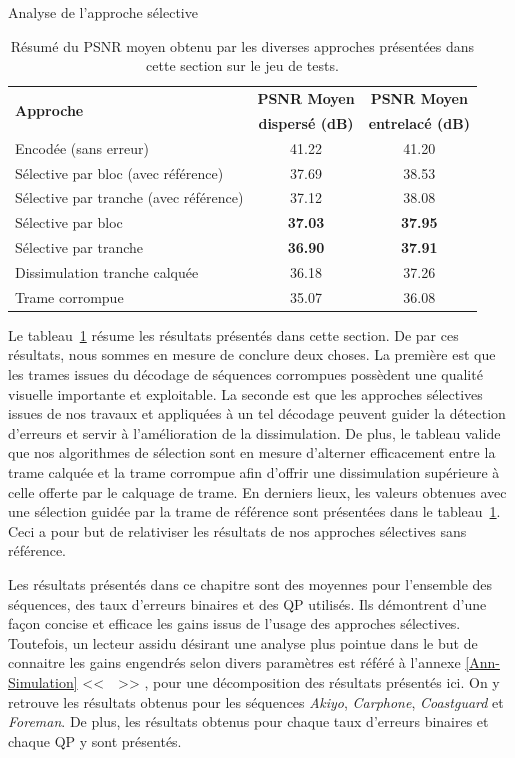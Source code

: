 \begin{section}{Analyse de l'approche sélective}
\begin{table}
\caption[Résumé du PSNR moyen obtenu par les diverses approches
présentées]{Résumé du PSNR moyen obtenu par les diverses approches présentées dans cette section sur le jeu de tests.}
\label{tab-ResumeSelectif}
\small
\centering
\begin{tabular}{| l | c | c |}
 \hline
 \multirow{2}{*}{\textbf{Approche}} & \textbf{PSNR Moyen}& \textbf{PSNR
 Moyen}\\ &\textbf{dispersé (dB)}&\textbf{entrelacé (dB)}\\
 \hline
 Encodée (sans erreur) & 41.22 & 41.20\\
  \hline
 Sélective par bloc (avec référence) & 37.69 & 38.53\\
  \hline
 Sélective par tranche (avec référence) & 37.12 & 38.08\\
  \hline
 Sélective par bloc & \textbf{37.03} & \textbf{37.95}\\
  \hline
 Sélective par tranche & \textbf{36.90} & \textbf{37.91}\\
  \hline
 Dissimulation tranche calquée & 36.18 & 37.26\\
  \hline
 Trame corrompue & 35.07 & 36.08\\
 \hline   
\end{tabular}
\end{table}

Le tableau~\ref{tab-ResumeSelectif} résume les résultats présentés dans cette
section. De par ces résultats, nous sommes en mesure de conclure deux choses. La
première est que les trames issues du décodage de séquences corrompues possèdent
une qualité visuelle importante et exploitable. La seconde est que les approches
sélectives issues de nos travaux et appliquées à un tel décodage peuvent guider
la détection d'erreurs et servir à l'amélioration de la dissimulation. De plus,
le tableau valide que nos algorithmes de sélection sont en mesure d’alterner
efficacement entre la trame calquée et la trame corrompue afin d’offrir une
dissimulation supérieure à celle offerte par le calquage de trame. En derniers
lieux, les valeurs obtenues avec une sélection guidée par la trame de référence
sont présentées dans le tableau~\ref{tab-ResumeSelectif}. Ceci a pour but
de relativiser les résultats de nos approches sélectives sans référence.

Les résultats présentés dans ce chapitre sont des moyennes pour l'ensemble des
séquences, des taux d'erreurs binaires et des QP utilisés. Ils démontrent d'une
façon concise et efficace les gains issus de l'usage des approches sélectives.
Toutefois, un lecteur assidu désirant une analyse plus pointue dans le but de
connaitre les gains engendrés selon divers paramètres est référé à l'annexe
\ref{Ann-Simulation} <<~~>> , pour
une décomposition des résultats présentés ici. On y retrouve les résultats
obtenus pour les séquences \textit{Akiyo}, \textit{Carphone},
\textit{Coastguard} et \textit{Foreman}. De plus, les résultats obtenus pour
chaque taux d'erreurs binaires et chaque QP y sont présentés.
\end{section}